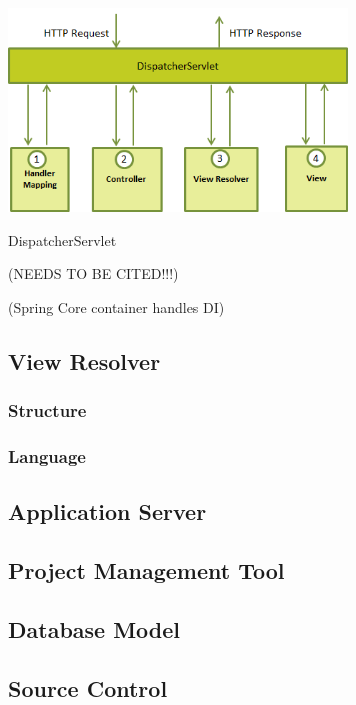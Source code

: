 \begin{table}[H]
\begin{center}
\includegraphics[width=9cm]{dispatchservlet.png}
\end{center}
\caption{DispatcherServlet }
\label{fig:dispatcherflow}
\end{table}

(NEEDS TO BE CITED!!!)


(Spring Core container handles DI)

\subsection{View Resolver}

\subsubsection{Structure}

\subsubsection{Language}

\subsection{Application Server}

\subsection{Project Management Tool}

\subsection{Database Model}

\subsection{Source Control}

